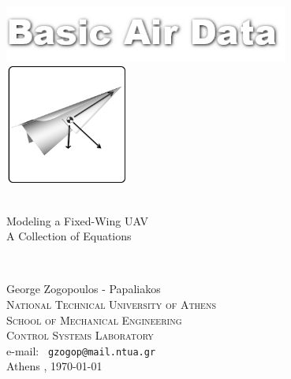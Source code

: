 \begin{titlepage}
\begin{center}

\includegraphics[width=0.7\textwidth]{./Figures/BADLogo}~\\[1cm]
\includegraphics[width=0.3\textwidth]{./Figures/aeroplanino}~\\[1cm]

\HRule \\
\linespread{1.5}
\begin{huge}
Modeling a Fixed-Wing UAV\\
A Collection of Equations\\

\par
\end{huge}
\HRule \\

\vfill

{\Large
George Zogopoulos - Papaliakos
} \\[0.3cm]
\textsc{\large 
National Technical University of Athens
}\\
\textsc{School of Mechanical Engineering\\ Control Systems Laboratory} \\[0.3cm]
e-mail: \texttt{
gzogop@mail.ntua.gr
} \\[1cm]
{
Athens
, \today}

	

\end{center}

\end{titlepage}